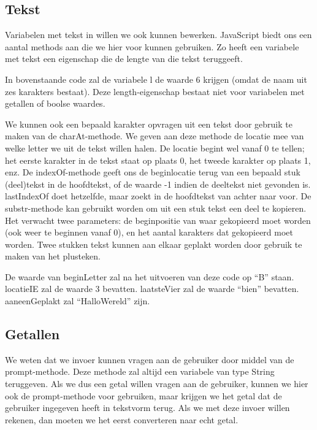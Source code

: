 \subsection{Tekst}

Variabelen met tekst in willen we ook kunnen bewerken. JavaScript biedt ons een aantal methods aan die we hier voor kunnen gebruiken. Zo heeft een variabele met tekst een eigenschap die de lengte van die tekst teruggeeft.


In bovenstaande code zal de variabele l de waarde 6 krijgen (omdat de naam uit zes karakters bestaat). Deze length-eigenschap bestaat niet voor variabelen met getallen of boolse waardes.

We kunnen ook een bepaald karakter opvragen uit een tekst door gebruik te maken van de charAt-methode. We geven aan deze methode de locatie mee van welke letter we uit de tekst willen halen. De locatie begint wel vanaf 0 te tellen; het eerste karakter in de tekst staat op plaats 0, het tweede karakter op plaats 1, enz. De indexOf-methode geeft ons de beginlocatie terug van een bepaald stuk (deel)tekst in de hoofdtekst, of de waarde -1 indien de deeltekst niet gevonden is. lastIndexOf doet hetzelfde, maar zoekt in de hoofdtekst van achter naar voor. De substr-methode kan gebruikt worden om uit een stuk tekst een deel te kopieren. Het verwacht twee parameters: de beginpositie van waar gekopieerd moet worden (ook weer te beginnen vanaf 0), en het aantal karakters dat gekopieerd moet worden. Twee stukken tekst kunnen aan elkaar geplakt worden door gebruik te maken van het plusteken.


De waarde van beginLetter zal na het uitvoeren van deze code op ``B'' staan. locatieIE zal de waarde 3 bevatten. laatsteVier zal de waarde ``bien'' bevatten. aaneenGeplakt zal ``HalloWereld'' zijn.

\subsection{Getallen}
We weten dat we invoer kunnen vragen aan de gebruiker door middel van de prompt-methode. Deze methode zal altijd een variabele van type String teruggeven. Als we dus een getal willen vragen aan de gebruiker, kunnen we hier ook de prompt-methode voor gebruiken, maar krijgen we het getal dat de gebruiker ingegeven heeft in tekstvorm terug. Als we met deze invoer willen rekenen, dan moeten we het eerst converteren naar echt getal.

